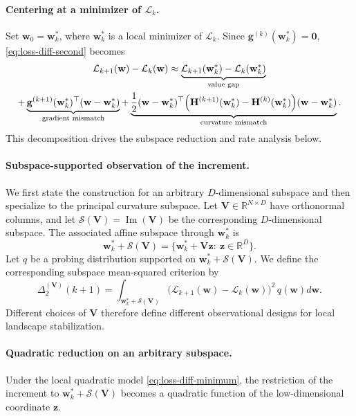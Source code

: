 \documentclass[10pt]{article}
\theoremstyle{plain}
\theoremstyle{remark}
\begin{document}
\paragraph{Centering at a minimizer of $\mathcal L_k$.}
Set $\mathbf w_0=\mathbf w_k^*$, where $\mathbf w_k^*$ is a local minimizer of $\mathcal L_k$.
Since $\mathbf g^{(k)}(\mathbf w_k^*)=\mathbf 0$, \eqref{eq:loss-diff-second} becomes
\begin{multline}
\label{eq:loss-diff-minimum}
\mathcal L_{k+1}(\mathbf w)-\mathcal L_k(\mathbf w)
\approx
\underbrace{\mathcal L_{k+1}(\mathbf w_k^*)-\mathcal L_k(\mathbf w_k^*)}_{\text{value gap}}
\\
+
\underbrace{\mathbf g^{(k+1)}(\mathbf w_k^*)^\top(\mathbf w-\mathbf w_k^*)}_{\text{gradient mismatch}}
+
\underbrace{\frac12(\mathbf w-\mathbf w_k^*)^\top
\Bigl(\mathbf H^{(k+1)}(\mathbf w_k^*)-\mathbf H^{(k)}(\mathbf w_k^*)\Bigr)
(\mathbf w-\mathbf w_k^*)}_{\text{curvature mismatch}}.
\end{multline}
This decomposition drives the subspace reduction and rate analysis below.

\paragraph{Subspace-supported observation of the increment.}
We first state the construction for an arbitrary $D$-dimensional subspace and then specialize to the principal curvature subspace.
Let $\mathbf V \in \mathbb R^{N\times D}$ have orthonormal columns, and let $\mathcal S(\mathbf V)=\operatorname{Im}(\mathbf V)$ be the corresponding $D$-dimensional subspace.
The associated affine subspace through $\mathbf w_k^*$ is
\[
\mathbf w_k^*+\mathcal S(\mathbf V)
=
\{\mathbf w_k^*+\mathbf V\mathbf z:\ \mathbf z\in\mathbb R^D\}.
\]
Let $q$ be a probing distribution supported on $\mathbf w_k^*+\mathcal S(\mathbf V)$.
We define the corresponding subspace mean-squared criterion by
\begin{equation}
\label{eq:delta2-general-subspace-revised}
\Delta_2^{(\mathbf V)}(k+1)
=
\int_{\mathbf w_k^*+\mathcal S(\mathbf V)}
\bigl(
\mathcal L_{k+1}(\mathbf w)-\mathcal L_k(\mathbf w)
\bigr)^2
\, q(\mathbf w) d\mathbf w.
\end{equation}
Different choices of $\mathbf V$ therefore define different observational designs for local landscape stabilization.

\paragraph{Quadratic reduction on an arbitrary subspace.}
Under the local quadratic model \eqref{eq:loss-diff-minimum}, the restriction of the increment to $\mathbf w_k^*+\mathcal S(\mathbf V)$ becomes a quadratic function of the low-dimensional coordinate $\mathbf z$.
\end{document}
